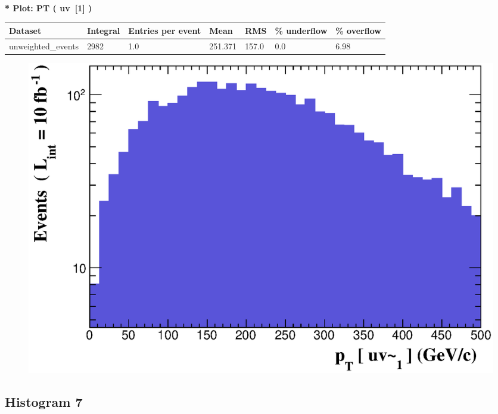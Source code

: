 \documentclass[a4paper, 10pt]{article}
\begin{document}
\textbf{* Plot: PT ( uv~[1] ) }\\
   \begin{table}[H]
  \begin{center}
    \begin{tabular}{|m{23.0mm}|m{23.0mm}|m{18.0mm}|m{19.0mm}|m{19.0mm}|m{19.0mm}|m{19.0mm}|}
      \hline
      {\cellcolor{yellow}         Dataset}& {\cellcolor{yellow}         Integral}& {\cellcolor{yellow}         Entries per event}& {\cellcolor{yellow}         Mean}& {\cellcolor{yellow}         RMS}& {\cellcolor{yellow}         \% underflow}& {\cellcolor{yellow}         \% overflow}\\
      \hline
      {\cellcolor{white}         unweighted\_events}& {\cellcolor{white}         2982}& {\cellcolor{white}         1.0}& {\cellcolor{white}         251.371}& {\cellcolor{white}         157.0}& {\cellcolor{orange}         0.0}& {\cellcolor{orange}         6.98}\\
\hline
    \end{tabular}
  \end{center}
\end{table}

\begin{figure}[H]
  \begin{center}
    \includegraphics[scale=0.45]{selection_5.eps}\\
\caption{   }
  \end{center}
\end{figure}
      \newpage
\subsection{ Histogram 7}
\end{document}
